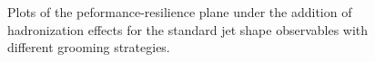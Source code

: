 \documentclass[11pt,letterpaper]{article}
\begin{document}
\begin{figure}
  \caption{Plots of the peformance-resilience plane under the addition of hadronization effects for the standard jet shape observables with different grooming strategies.}\label{fig:grooming-hadronisation}
\end{figure}
\end{document}
